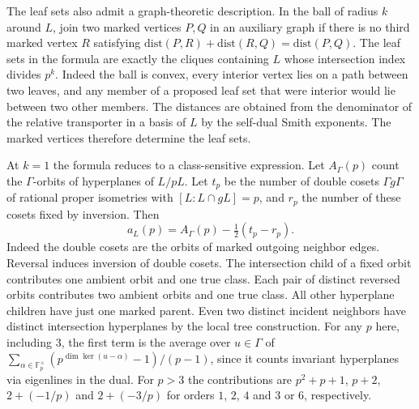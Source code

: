 The leaf sets also admit a graph-theoretic description. In the ball of
radius $k$ around $L$, join two marked vertices $P,Q$ in an auxiliary
graph if there is no third marked vertex $R$ satisfying
$\mathrm{dist}(P,R)+\mathrm{dist}(R,Q)=\mathrm{dist}(P,Q)$.
The leaf sets in the formula are exactly the cliques containing $L$
whose intersection index divides $p^k$. Indeed the ball is convex,
every interior vertex lies on a path between two leaves, and any
member of a proposed leaf set that were interior would lie between
two other members. The distances are obtained from the denominator of
the relative transporter in a basis of $L$ by the self-dual Smith
exponents. The marked vertices therefore determine the leaf sets.

At $k=1$ the formula reduces to a class-sensitive expression. Let
$A_\Gamma(p)$ count the $\Gamma$-orbits of hyperplanes of $L/pL$.
Let $t_p$ be the number of double cosets $\Gamma g\Gamma$ of
rational proper isometries with $[L:L\cap gL]=p$, and $r_p$ the
number of these cosets fixed by inversion. Then
\[
                a_L(p)=A_\Gamma(p)-\tfrac12(t_p-r_p).
\]
Indeed the double cosets are the orbits of marked outgoing neighbor
edges. Reversal induces inversion of double cosets. The intersection
child of a fixed orbit contributes one ambient orbit and one true
class. Each pair of distinct reversed orbits contributes two ambient
orbits and one true class. All other hyperplane children have just
one marked parent. Even two distinct incident neighbors have distinct
intersection hyperplanes by the local tree construction. For any
$p$ here, including $3$, the first term is the average over $u\in\Gamma$
of $\sum_{\alpha\in\mathbb F_p^\times}
(p^{\dim\ker(u-\alpha)}-1)/(p-1)$, since it counts invariant
hyperplanes via eigenlines in the dual. For $p>3$ the contributions
are $p^2+p+1$, $p+2$, $2+(-1/p)$ and $2+(-3/p)$ for orders
$1$, $2$, $4$ and $3$ or $6$, respectively.

